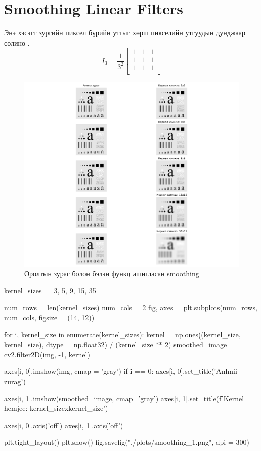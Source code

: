 \documentclass[a4paper]{article}
\begin{document}
\section{Smoothing Linear Filters}
Энэ хэсэгт зургийн пиксел бүрийн утгыг хөрш пикселийн утгуудын дунджаар солино \cite{gonzalez2009digital}. 
\begin{equation}
I_{3} = \frac{1}{3^2}
\begin{bmatrix}
1 & 1 & 1 \\
1 & 1 & 1 \\
1 & 1 & 1 \\
\end{bmatrix}
\end{equation}
\begin{figure}[H]
  \centering
  \includegraphics[scale = 0.30]{smoothing_1.png}
  \caption[Intensity 1]{Оролтын зураг болон бэлэн функц ашигласан smoothing}
\end{figure}
\begin{python}
kernel_sizes = [3, 5, 9, 15, 35]

num_rows = len(kernel_sizes)
num_cols = 2
fig, axes = plt.subplots(num_rows, num_cols, figsize = (14, 12))

for i, kernel_size in enumerate(kernel_sizes):
    kernel = np.ones((kernel_size, kernel_size), dtype = np.float32) / (kernel_size ** 2)
    smoothed_image = cv2.filter2D(img, -1, kernel)

    axes[i, 0].imshow(img, cmap = 'gray')
    if i == 0:
        axes[i, 0].set_title('Anhnii zurag')

    axes[i, 1].imshow(smoothed_image, cmap='gray')
    axes[i, 1].set_title(f'Kernel hemjee: {kernel_size}x{kernel_size}')

    axes[i, 0].axis('off')
    axes[i, 1].axis('off')


plt.tight_layout()
plt.show()
fig.savefig("./plots/smoothing_1.png", dpi = 300)
\end{python}
\end{document}
